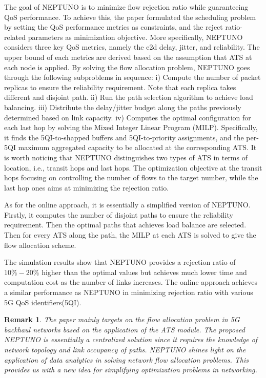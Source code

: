 \documentclass[12pt]{article}
\newtheorem*{remark}{Remark}
\begin{document}
The goal of NEPTUNO is to minimize flow rejection ratio while guaranteeing QoS performance. To achieve this, the paper formulated the scheduling problem by setting the QoS performance metrics as constraints, and the reject ratio-related parameters as minimization objective. More specifically, NEPTUNO considers three key QoS metrics, namely the e2d delay, jitter, and reliability. The upper bound of each metrics are derived based on the assumption that ATS at each node is applied. By solving the flow allocation problem, NEPTUNO goes through the following subproblems in sequence: i) Compute the number of packet replicas to ensure the reliability requirement. Note that each replica takes different and disjoint path. ii) Run the path selection algorithm to achieve load balancing.  iii) Distribute the delay/jitter budget along the paths previously determined based on link capacity. iv) Computes the optimal configuration for each last hop by solving the Mixed Integer Linear Program (MILP). Specifically, it finds the 5QI-to-shapped buffers and 5QI-to-priority assignments, and the per-5QI maximum aggregated capacity to be allocated at the corresponding ATS. It is worth noticing that NEPTUNO distinguishes two types of ATS in terms of location, i.e., transit hops and last hops. The optimization objective at the transit hops focusing on controlling the number of flows to the target number, while the last hop ones aims at minimizing the rejection ratio. 

As for the online approach, it is essentially a simplified version of NEPTUNO. Firstly, it computes the number of disjoint paths to ensure the reliability requirement. Then the optimal paths that achieves load balance are selected. Then for every ATS along the path, the MILP at each ATS is solved to give the flow allocation scheme. 

The simulation results show that NEPTUNO provides a rejection ratio of $10\% - 20\%$ higher than the optimal values but achieves much lower time and computation cost as the number of links increases. 
The online approach achieves a similar performance as NEPTUNO in minimizing rejection ratio with various 5G QoS identifiers(5QI).

\begin{remark}
The paper mainly targets on the flow allocation problem in 5G backhaul networks based on the application of the ATS module. The proposed NEPTUNO is essentially a centralized solution since it requires the knowledge of network topology and link occupancy of paths. NEPTUNO shines light on the application of data analytics in solving network flow allocation problems. This provides us with a new idea for simplifying optimization problems in networking.
\end{remark}
\end{document}
